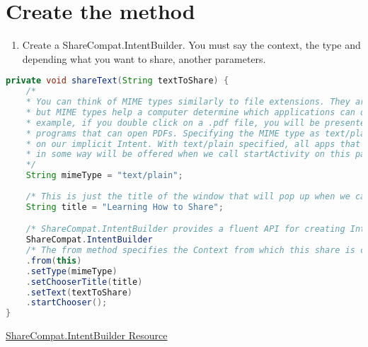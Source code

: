 \documentclass[12pt]{article} %
\begin{document}

\section{Create the method}

\begin{enumerate}
	\item Create a ShareCompat.IntentBuilder. You must say the context, the type and depending what you want to share, another parameters.
\end{enumerate}

\begin{lstlisting}[language=Java]
    private void shareText(String textToShare) {
	/*
	* You can think of MIME types similarly to file extensions. They aren't the exact same,
	* but MIME types help a computer determine which applications can open which content. For
	* example, if you double click on a .pdf file, you will be presented with a list of
	* programs that can open PDFs. Specifying the MIME type as text/plain has a similar affect
	* on our implicit Intent. With text/plain specified, all apps that can handle text content
	* in some way will be offered when we call startActivity on this particular Intent.
	*/
	String mimeType = "text/plain";
	
	/* This is just the title of the window that will pop up when we call startActivity */
	String title = "Learning How to Share";

	/* ShareCompat.IntentBuilder provides a fluent API for creating Intents */
	ShareCompat.IntentBuilder
	/* The from method specifies the Context from which this share is coming from */
	.from(this)
	.setType(mimeType)
	.setChooserTitle(title)
	.setText(textToShare)
	.startChooser();
}


\end{lstlisting}

\href{https://developer.android.com/reference/android/support/v4/app/ShareCompat.IntentBuilder.html}{ShareCompat.IntentBuilder Resource}
\end{document}
